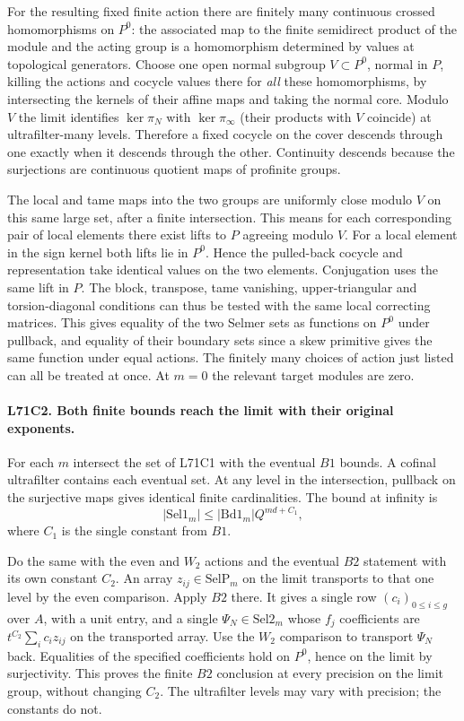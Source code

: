 For the resulting fixed finite action there are finitely many
continuous crossed homomorphisms on $P^0$: the associated map
to the finite semidirect product of the module and the acting group
is a homomorphism determined by values at topological generators.
Choose one open normal subgroup $V\subset P^0$, normal in $P$,
killing the actions and cocycle values there for \emph{all}
these homomorphisms, by intersecting the kernels of their affine
maps and taking the normal core. Modulo $V$ the limit identifies
$\ker\pi_N$ with $\ker\pi_\infty$ (their products with $V$
coincide) at ultrafilter-many levels. Therefore a fixed cocycle
on the cover descends through one exactly when it descends
through the other. Continuity descends because the surjections
are continuous quotient maps of profinite groups.

The local and tame maps into the two groups are uniformly close
modulo $V$ on this same large set, after a finite intersection.
This means for each corresponding pair of local elements there
exist lifts to $P$ agreeing modulo $V$. For a local element
in the sign kernel both lifts lie in $P^0$. Hence the pulled-back cocycle
and representation take identical values on the two elements.
Conjugation uses the same lift in $P$. The block, transpose,
tame vanishing, upper-triangular and torsion-diagonal conditions
can thus be tested with the same local correcting matrices.
This gives equality of the two Selmer sets as functions on
$P^0$ under pullback, and equality of their boundary sets since
a skew primitive gives the same function under equal actions.
The finitely many choices of action just listed can all be treated
at once. At $m=0$ the relevant target modules are zero.

\paragraph{L71C2. Both finite bounds reach the limit with their original exponents.}
For each $m$ intersect the set of L71C1 with the eventual
$B1$ bounds. A cofinal ultrafilter contains each eventual set.
At any level in the intersection, pullback on the surjective
maps gives identical finite cardinalities. The bound at infinity is
\[
     |\mathrm{Sel1}_m|\le |\mathrm{Bd1}_m|Q^{md+C_1},
\]
where $C_1$ is the single constant from $B1$.

Do the same with the even and $W_2$ actions and the eventual
$B2$ statement with its own constant $C_2$. An array
$z_{ij}\in\mathrm{SelP}_m$ on the limit transports to that one
level by the even comparison. Apply $B2$ there. It gives a single
row $(c_i)_{0\le i\le g}$ over $A$, with a unit entry, and a
single $\Psi_N\in\mathrm{Sel2}_m$ whose $f_j$ coefficients
are $t^{C_2}\sum_i c_i z_{ij}$ on the transported array.
Use the $W_2$ comparison to transport $\Psi_N$ back. Equalities
of the specified coefficients hold on $P^0$, hence on the limit
by surjectivity. This proves the finite $B2$ conclusion at every
precision on the limit group, without changing $C_2$. The
ultrafilter levels may vary with precision; the constants do not.

